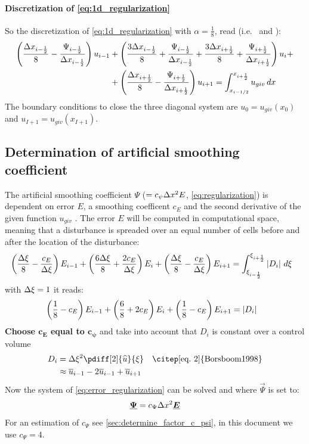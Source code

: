 \paragraph*{Discretization of \autoref{eq:1d_regularization}}
So the discretization of \autoref{eq:1d_regularization} with $\alpha = \frac{1}{8}$, read (i.e.\ \citet[eq.\ 7]{Borsboom1998} and \citet[eq.\ 6]{Borsboom2003}):
\begin{align}
\left( \frac{\Delta x_{i-\frac{1}{2}}}{8}
- \frac{\Psi_{i-\frac{1}{2}}}{\Delta x_{i-\frac{1}{2}}} \right)  u_{i-1} &
+ \left( \frac{3\Delta x_{i-\frac{1}{2}}}{8}  + \frac{\Psi_{i-\frac{1}{2}}}{{\Delta x_{i-\frac{1}{2}}}}  + \frac{3\Delta x_{i+\frac{1}{2}}}{8} +  \frac{\Psi_{i+\frac{1}{2}}}{{\Delta x_{i+\frac{1}{2}}}} \right)  u_i +
\\
& + \left(  \frac{\Delta x_{i+\frac{1}{2}}}{8} - \frac{\Psi_{i+\frac{1}{2}}}{{\Delta x_{i+\frac{1}{2}}}} \right)  u_{i+1}  = \int_{x_{i-1/2}}^{x_{i+\frac{1}{2}}} u_{giv}\, dx
\label{eq:disc_regularization}
\end{align}
The boundary conditions to close the three diagonal system are $u_0  = {u_{giv}}(x_{0})$ and $u_{I+1} = {u_{giv}}(x_{I+1})$.

\subsection{Determination of artificial smoothing coefficient}
\label{sec:determine_psi}
The artificial smoothing coefficient $\Psi$ ($ = c_{\psi} \Delta x^2 E$, \autoref{eq:regularization}) is dependent on error $E$, a smoothing coefficent $c_E$ and the second derivative of the given function $u_{giv}$ \citep[eq.\ 8]{Borsboom1998}.
The error $E$ will be computed in computational space, meaning that a disturbance is spreaded over an equal number of cells before and after the location of the disturbance:
%
\begin{align}
    &\left(\frac{\Delta \xi}{8}-\frac{c_E}{\Delta \xi}\right) E_{i-1} + \left(\frac{6\Delta \xi}{8} + \frac{2c_E}{\Delta \xi}\right) E_i + \left(\frac{\Delta \xi}{8} - \frac{c_E}{\Delta \xi}\right)E_{i+1}
    =  \int_{\xi_{i-\frac{1}{2}}}^{\xi_{i+\frac{1}{2}}} \left\lvert D_i \right\rvert \, d\xi
    \label{eq:error_regularization}
\end{align}
with $\Delta \xi =1$ it reads:
\begin{align}
    &\left(\frac{1}{8}-c_E\right) E_{i-1} + \left(\frac{6}{8} + 2c_E\right) E_i + \left(\frac{1}{8} - c_E\right)E_{i+1}
    =   \left\lvert D_i \right\rvert
\end{align}
\textbf{Choose $\mathbf{c_E}$ equal to $\mathbf{c_{\psi}}$} and take into account that $D_i$ is constant over a control volume
\begin{align}
    D_i & = \Dxi^2 \pdiff[2]{\uhat}{\xi} \quad \text{\citep[eq.\ 2]{Borsboom1998}}
    \\ & \approx {\ubar}_{i-1} - 2 {\ubar}_{i-1} + {\ubar}_{i+1}
\end{align}
%
Now the system of \autoref{eq:error_regularization} can be solved and where $\vec{\Psi}$ is set to:
\begin{align}
    \mbox{\boldmath $\underline{\Psi}$} = c_{\Psi}\Delta x^2 \mbox{\boldmath $\underline{E}$}
\end{align}
For an estimation of $c_{\Psi}$ see \autoref{sec:determine_factor_c_psi}, in this document we use $c_{\Psi} = 4$.

